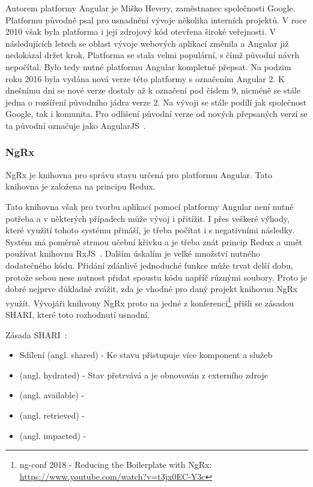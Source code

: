 Autorem platformy Angular je Miško Hevery, zaměstnanec společnosti Google. Platformu původně psal pro usnadnění vývoje několika interních projektů. V roce 2010 však byla platforma i její zdrojový kód otevřena široké veřejnosti. V následujících letech se oblast vývoje webových aplikací změnila a Angular již nedokázal držet krok. Platforma se stala velmi populární, s čímž původní návrh nepočítal. Bylo tedy nutné platformu Angular kompletně přepsat. Na podzim roku 2016 byla vydána nová verze této platformy s označením Angular 2. K dnešnímu dni se nové verze dostaly až k označení pod číslem 9, nicméně se stále jedna o rozšíření původního jádra verze 2. Na vývoji se stále podílí jak společnost Google, tak i komunita. Pro odlišení původní verze od nových přepsaných verzí se ta původní označuje jako AngularJS~\cite{bib:angular-history}.

\subsubsection{NgRx}
NgRx je knihovna pro správu stavu určená pro platformu Angular. Tato knihovna je založena na principu Redux.
\blindtext %

Tato knihovna však pro tvorbu aplikací pomocí platformy Angular není nutně potřeba a v některých případech může vývoj i přitížit. I přes veškeré výhody, které využití tohoto systému přináší, je třeba počítat i s negativními následky. Systém má poměrně strmou učební křivku a je třeba znát princip Redux a umět používat knihovnu RxJS~\cite{bib:ngrx-docs}.
Dalším úskalím je velké množství nutného dodatečného kódu. Přidání zdánlivě jednoduché funkce může trvat delší dobu, protože sebou nese nutnost přidat spoustu kódu napříč různými soubory. Proto je dobré nejprve důkladně zvážit, zda je vhodné pro daný projekt knihovnu NgRx využít. Vývojáři knihvony NgRx proto na jedné z konferencí\footnote {ng-conf 2018 - Reducing the Boilerplate with NgRx: \url{https://www.youtube.com/watch?v=t3jx0EC-Y3c}} přišli se zásadou SHARI, které toto rozhodnutí usnadní. 

Zásada SHARI~\cite{biib:ng-conf}:
\begin{itemize}
  \item Sdílení (angl. shared) - Ke stavu přistupuje více komponent a služeb
  \item (angl. hydrated) - Stav přetrvává a je obnovován z externího zdroje
  \item (angl. available) - 
  \item (angl. retrieved) - 
  \item (angl. impacted) - 
\end{itemize}

